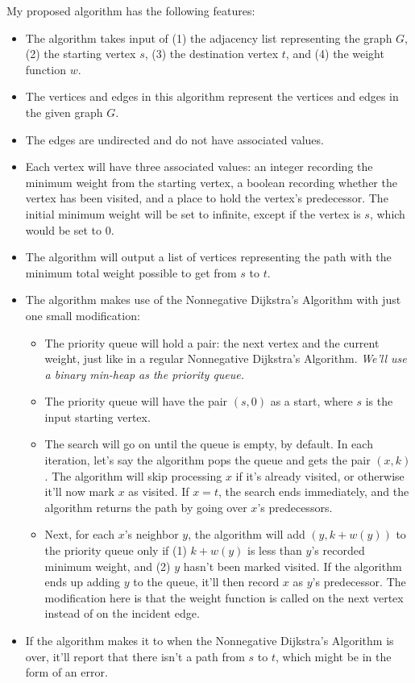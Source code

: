 \documentclass{article}
\begin{document}
\begin{enumerate}
    My proposed algorithm has the following features:
    \begin{itemize}
      \item The algorithm takes input of (1) the adjacency list representing the graph $G$, (2) the starting vertex $s$, (3) the destination vertex $t$, and (4) the weight function $w$.
      \item The vertices and edges in this algorithm represent the vertices and edges in the given graph $G$.
      \item The edges are undirected and do not have associated values.
      \item Each vertex will have three associated values: an integer recording the minimum weight from the starting vertex, a boolean recording whether the vertex has been visited, and a place to hold the vertex's predecessor. The initial minimum weight will be set to infinite, except if the vertex is $s$, which would be set to 0.
      \item The algorithm will output a list of vertices representing the path with the minimum total weight possible to get from $s$ to $t$.
      \item The algorithm makes use of the Nonnegative Dijkstra's Algorithm with just one small modification:
        \begin{itemize}
          \item The priority queue will hold a pair: the next vertex and the current weight, just like in a regular Nonnegative Dijkstra's Algorithm. \textit{We'll use a binary min-heap as the priority queue.}
          \item The priority queue will have the pair $(s, 0)$ as a start, where $s$ is the input starting vertex.
          \item The search will go on until the queue is empty, by default. In each iteration, let's say the algorithm pops the queue and gets the pair $(x, k)$. The algorithm will skip processing $x$ if it's already visited, or otherwise it'll now mark $x$ as visited. If $x = t$, the search ends immediately, and the algorithm returns the path by going over $x$'s predecessors.
          \item Next, for each $x$'s neighbor $y$, the algorithm will add $(y, k + w(y))$ to the priority queue only if (1) $k + w(y)$ is less than $y$'s recorded minimum weight, and (2) $y$ hasn't been marked visited. If the algorithm ends up adding $y$ to the queue, it'll then record $x$ as $y$'s predecessor. The modification here is that the weight function is called on the next vertex instead of on the incident edge.
        \end{itemize}
      \item If the algorithm makes it to when the Nonnegative Dijkstra's Algorithm is over, it'll report that there isn't a path from $s$ to $t$, which might be in the form of an error.
    \end{itemize}


\end{enumerate}
\end{document}
